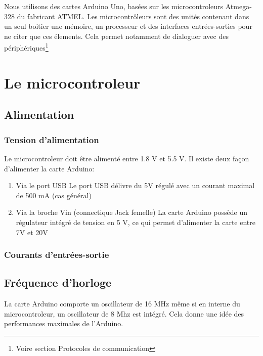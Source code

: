 Nous utilisons des cartes Arduino Uno, basées sur les microcontroleurs Atmega-328 du fabricant ATMEL.\newline
Les microcontrôleurs sont des unités contenant dans un seul boitier une mémoire, un processeur et des interfaces entrées-sorties pour ne citer que ces élements.
 \newline
 Cela permet notamment de dialoguer avec des périphériques\footnote{Voire section Protocoles de communication}

\section{Le microcontroleur}


\subsection{Alimentation}

\subsubsection{Tension d'alimentation}

Le microcontroleur doit être alimenté entre 1.8 V et 5.5 V. \newline
Il existe deux façon d'alimenter la carte Arduino: 

\begin{enumerate}
\item Via le port USB 
Le port USB délivre du 5V régulé avec un courant maximal de 500 mA (cas général)
\item Via la broche Vin (connectique Jack femelle)
La carte Arduino possède un régulateur intégré de tension en 5 V, ce qui permet d'alimenter la carte entre 7V et 20V

\end{enumerate}

\subsubsection{Courants d'entrées-sortie}

\subsection{Fréquence d'horloge}

La carte Arduino comporte un oscillateur de 16 MHz même si en interne du microcontroleur, un oscillateur de 8 Mhz est intégré.
Cela donne une idée des performances maximales de l'Arduino.



